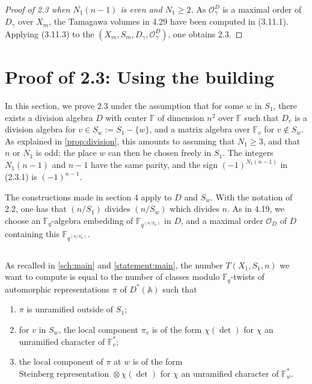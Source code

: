 \documentclass[11pt,a4paper]{article}
\theoremstyle{plain}
\theoremstyle{definition}
\newcommand{\Fq}{\mathbb{F}_q}
\newcommand{\F}{\mathbb{F}}
\begin{document}
\begin{proof}[Proof of 2.3 when $N_1(n-1)$ is even and $N_1 \geq 2$]
As $\mathcal{O}_\gamma^D$ is a maximal order of $D_\gamma$ over $X_m$, the Tamagawa volumes in 4.29 have been computed in (3.11.1). Applying (3.11.3) to the $(X_m, S_m, D_\gamma, \mathcal{O}_\gamma^D)$, one obtains 2.3.
\end{proof}

\section{Proof of 2.3: Using the building}

In this section, we prove 2.3 under the assumption that for some $w$ in $S_1$, there exists a division algebra $D$ with center $\mathbb{F}$ of dimension $n^2$ over $\mathbb{F}$ such that $D_v$ is a division algebra for $v \in S_w := S_1 - \{w\}$, and a matrix algebra over $\mathbb{F}_v$ for $v \notin S_w$. As explained in \ref{prop:division}, this amounts to assuming that $N_1 \geq 3$, and that $n$ or $N_1$ is odd; the place $w$ can then be chosen freely in $S_1$. The integers $N_1(n-1)$ and $n-1$ have the same parity, and the sign $(-1)^{N_1(n-1)}$ in (2.3.1) is $(-1)^{n-1}$.

The constructions made in section 4 apply to $D$ and $S_w$. With the notation of 2.2, one has that $(n/S_1)$ divides $(n/S_w)$ which divides $n$. As in 4.19, we choose an $\Fq$-algebra embedding of $\F_{q^{(n/S_w)}}$ in $D$, and a maximal order $\mathcal{O}_D$ of $D$ containing this $\F_{q^{(n/S_w)}}$.

\subsection{}
As recalled in \ref{sch:main} and \ref{statement:main}, the number $T(X_1,S_1,n)$ we want to compute is equal to the number of classes modulo $\Fq$-twists of automorphic representations $\pi$ of $D^*(\mathbb{A})$ such that
\begin{enumerate}
\item[(i)] $\pi$ is unramified outside of $S_1$;
\item[(ii)] for $v$ in $S_w$, the local component $\pi_v$ is of the form $\chi(\det)$ for $\chi$ an unramified character of $\mathbb{F}_v^*$;
\item[(iii)] the local component of $\pi$ at $w$ is of the form $\text{Steinberg representation } \otimes \chi(\det)$ for $\chi$ an unramified character of $\mathbb{F}_w^*$.
\end{enumerate}
\end{document}
